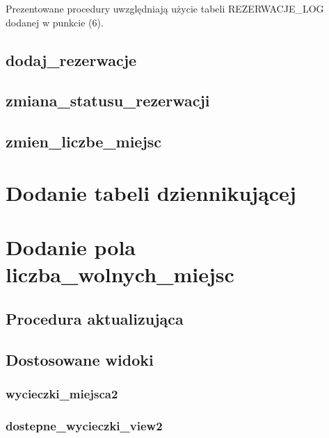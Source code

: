 \documentclass[12pt]{article}
\begin{document}
Prezentowane procedury uwzględniają użycie tabeli REZERWACJE_LOG dodanej w punkcie (6).

\subsection{dodaj\_rezerwacje}


\subsection{zmiana\_statusu\_rezerwacji}


\subsection{zmien\_liczbe\_miejsc}


\section{Dodanie tabeli dziennikującej}



\section{Dodanie pola liczba_wolnych_miejsc}



\subsection{Procedura aktualizująca}


\subsection{Dostosowane widoki}

\subsubsection{wycieczki\_miejsca2}


\subsubsection{dostepne\_wycieczki\_view2}

\end{document}

